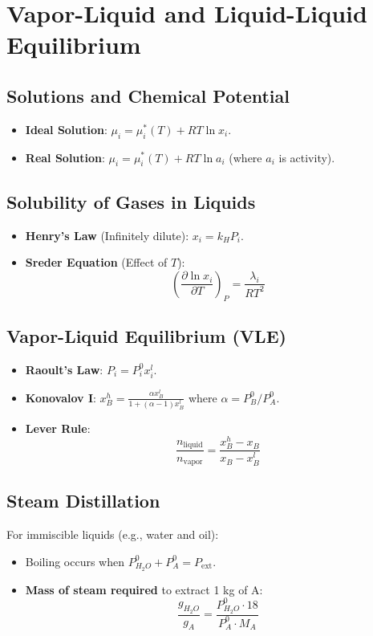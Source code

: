 \section{Vapor-Liquid and Liquid-Liquid Equilibrium}

\subsection{Solutions and Chemical Potential}
\begin{itemize}
    \item \textbf{Ideal Solution}: $\mu_i = \mu_i^*(T) + RT \ln x_i$.
    \item \textbf{Real Solution}: $\mu_i = \mu_i^*(T) + RT \ln a_i$ (where $a_i$ is activity).
\end{itemize}

\subsection{Solubility of Gases in Liquids}
\begin{itemize}
    \item \textbf{Henry's Law} (Infinitely dilute): $x_i = k_H P_i$.
    \item \textbf{Sreder Equation} (Effect of $T$):
    \begin{equation}
        \left( \frac{\partial \ln x_i}{\partial T} \right)_P = \frac{\lambda_i}{RT^2}
    \end{equation}
\end{itemize}

\subsection{Vapor-Liquid Equilibrium (VLE)}
\begin{itemize}
    \item \textbf{Raoult's Law}: $P_i = P_i^0 x_i^l$.
    \item \textbf{Konovalov I}: $x_B^h = \frac{\alpha x_B^l}{1 + (\alpha - 1)x_B^l}$ where $\alpha = P_B^0 / P_A^0$.
    \item \textbf{Lever Rule}: 
    \begin{equation}
        \frac{n_{\text{liquid}}}{n_{\text{vapor}}} = \frac{x_B^h - x_B}{x_B - x_B^l}
    \end{equation}
\end{itemize}

\subsection{Steam Distillation}
For immiscible liquids (e.g., water and oil):
\begin{itemize}
    \item Boiling occurs when $P_{H_2O}^0 + P_A^0 = P_{\text{ext}}$.
    \item \textbf{Mass of steam required} to extract 1 kg of A:
    \begin{equation}
        \frac{g_{H_2O}}{g_A} = \frac{P_{H_2O}^0 \cdot 18}{P_A^0 \cdot M_A}
    \end{equation}
\end{itemize}

